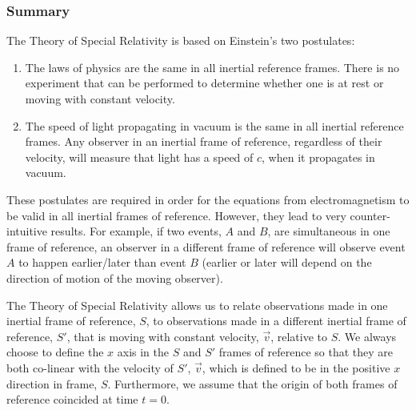 \subsubsection{Summary}

The Theory of Special Relativity is based on Einstein's two postulates:

\begin{enumerate}
\item The laws of physics are the same in all inertial reference frames. There is no experiment that can be performed to determine whether one is at rest or moving with constant velocity.
\item The speed of light propagating in vacuum is the same in all inertial reference frames. Any observer in an inertial frame of reference, regardless of their velocity, will measure that light has a speed of $c$, when it propagates in vacuum.
\end{enumerate}

These postulates are required in order for the equations from electromagnetism to be valid in all inertial frames of reference. However, they lead to very counter-intuitive results. For example, if two events, $A$ and $B$, are simultaneous in one frame of reference, an observer in a different frame of reference will observe event $A$ to happen earlier/later than event $B$ (earlier or later will depend on the direction of motion of the moving observer).

The Theory of Special Relativity allows us to relate observations made in one inertial frame of reference, $S$, to observations made in a different inertial frame of reference, $S'$, that is moving with constant velocity, $\vec v$, relative to $S$. We always choose to define the $x$ axis in the $S$ and $S'$ frames of reference so that they are both co-linear with the velocity of $S'$, $\vec v$, which is defined to be in the positive $x$ direction in frame, $S$. Furthermore, we assume that the origin of both frames of reference coincided at time $t=0$.

